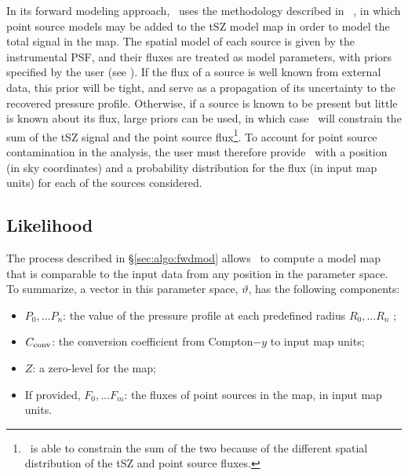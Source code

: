 In its forward modeling approach, \panco\ uses the methodology described in \eg\ \citet{keruzore_exploiting_2020}, in which point source models may be added to the tSZ model map in order to model the total signal in the map.
The spatial model of each source is given by the instrumental PSF, and their fluxes are treated as model parameters, with priors specified by the user (see ).
If the flux of a source is well known from external data, this prior will be tight, and serve as a propagation of its uncertainty to the recovered pressure profile.
Otherwise, if a source is known to be present but little is known about its flux, large priors can be used, in which case \panco\ will constrain the sum of the tSZ signal and the point source flux\footnote{\panco\ is able to constrain the sum of the two because of the different spatial distribution of the tSZ and point source fluxes.}.
To account for point source contamination in the analysis, the user must therefore provide \panco\ with a position (in sky coordinates) and a probability distribution for the flux (in input map units) for each of the sources considered.

\subsection{Likelihood} \label{sec:algo:likelihood}

The process described in \S\ref{sec:algo:fwdmod} allows \panco\ to compute a model map that is comparable to the input data from any position in the parameter space.
To summarize, a vector in this parameter space, $\vartheta$, has the following components:
\begin{itemize}[leftmargin=*]
    \item $P_0, \dots P_n$: the value of the pressure profile at each predefined radius $R_0, \dots R_n$ ; \\
    \item $C_{\rm conv}$: the conversion coefficient from Compton$-y$ to input map units;
    \item $Z$: a zero-level for the map;
    \item If provided, $F_0, \dots F_m$: the fluxes of point sources in the map, in input map units.
\end{itemize}

